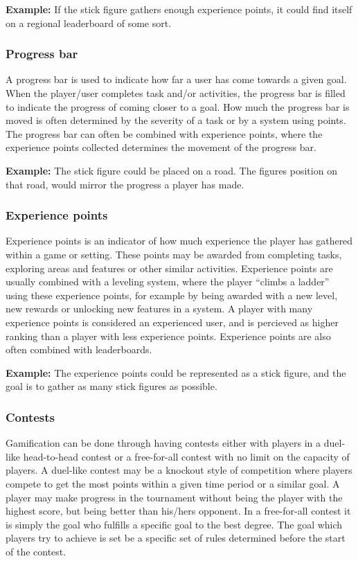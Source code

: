 \textbf{Example:} If the stick figure gathers enough experience points, it could find itself on a regional leaderboard of some sort. 

\subsubsection{Progress bar}
A progress bar is used to indicate how far a user has come towards a given goal. When the player/user completes task and/or activities, the progress bar is filled to indicate the progress of coming closer to a goal. How much the progress bar is moved is often determined by the severity of a task or by a system using points. The progress bar can often be combined with experience points, where the experience points collected determines the movement of the progress bar. 

\textbf{Example:} The stick figure could be placed on a road. The figures position on that road, would mirror the progress a player has made. 

\subsubsection{Experience points}
Experience points is an indicator of how much experience the player has gathered within a game or setting. These points may be awarded from completing tasks, exploring areas and features or other similar activities. Experience points are usually combined with a leveling system, where the player ``climbs a ladder'' using these experience points, for example by being awarded with a new level, new rewards or unlocking new features in a system. A player with many experience points is considered an experienced user, and is percieved as higher ranking than a player with less experience points. Experience points are also often combined with leaderboards. 

\textbf{Example:} The experience points could be represented as a stick figure, and the goal is to gather as many stick figures as possible. 

\subsubsection{Contests}
Gamification can be done through having contests either with players in a duel-like head-to-head contest or a free-for-all contest with no limit on the capacity of players. A duel-like contest may be a knockout style of competition where players compete to get the most points within a given time period or a similar goal. A player may make progress in the tournament without being the player with the highest score, but being better than his/hers opponent. In a free-for-all contest it is simply the goal who fulfills a specific goal to the best degree. The goal which players try to achieve is set be a specific set of rules determined before the start of the contest.

